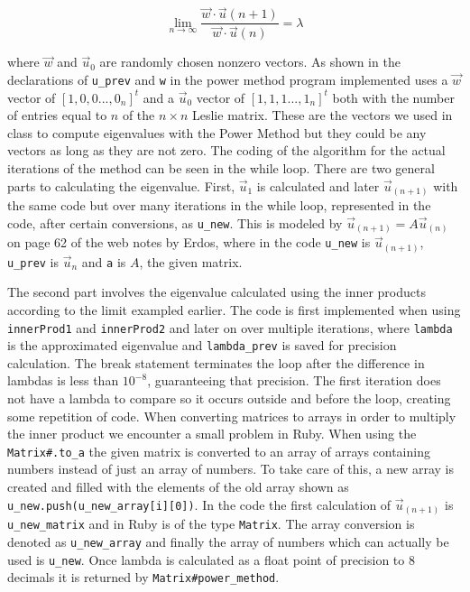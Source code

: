 \documentclass[letterpaper,12pt]{article}
\begin{document}
\[\lim_{n\to\infty} \frac{{\vec{w}} \cdot {\vec{u}(n+1)}}{ {\vec{w}} \cdot {\vec{u}(n)}} =\lambda\]

where $\vec{w}$ and $\vec{u}_0$ are randomly chosen nonzero vectors.
As shown in the declarations of \texttt{u\_prev} and \texttt{w} in the power
method program implemented uses a $\vec{w}$ vector of $[1,0,0 ... ,0_n]^t$
and a $\vec{u}_0$ vector of $[1,1,1 ... ,1_n]^t$ both with the number of entries
equal to $n$ of the $n \times n$ Leslie matrix.
These are the vectors we used in class to compute eigenvalues with the Power
Method but they could be any vectors as long as they are not zero.
The coding of the algorithm for the actual iterations of the method can be seen
in the while loop.
There are two general parts to calculating the eigenvalue.
First, $\vec{u}_1$ is calculated and later $\vec{u}_{(n+1)}$ with the same code
but over many iterations in the while loop, represented in the code, after
certain conversions, as \texttt{u\_new}.
This is modeled by $\vec{u}_{(n+1)} = A\vec{u}_{(n)}$ on page 62 of the web
notes by Erdos, where in the code \texttt{u\_new} is $\vec{u}_{(n+1)}$,
\texttt{u\_prev} is $\vec{u}_n$ and \texttt{a} is $A$, the given matrix.

The second part involves the eigenvalue calculated using the inner products
according to the limit exampled earlier.
The code is first implemented when using \texttt{innerProd1} and
\texttt{innerProd2} and later on over multiple iterations, where \texttt{lambda}
is the approximated eigenvalue and \texttt{lambda\_prev} is saved for precision
calculation.
The break statement terminates the loop after the difference in lambdas is less
than $10^{-8}$, guaranteeing that precision.
The first iteration does not have a lambda to compare so it occurs outside and
before the loop, creating some repetition of code.
When converting matrices to arrays in order to multiply the inner product we encounter a small problem in Ruby.
When using the \texttt{Matrix\#.to\_a} the given matrix is converted to an
array of arrays containing numbers instead of just an array of numbers.
To take care of this, a new array is created and filled with the elements of
the old array shown as \texttt{u\_new.push(u\_new\_array[i][0])}.
In the code the first calculation of $\vec{u}_{(n+1)}$ is \texttt{u\_new\_matrix}
and in Ruby is of the type \texttt{Matrix}.
The array conversion is denoted as \texttt{u\_new\_array} and finally the array
of numbers which can actually be used is \texttt{u\_new}.
Once lambda is calculated as a float point of precision to 8 decimals it is
returned by \texttt{Matrix\#power\_method}.
\end{document}
